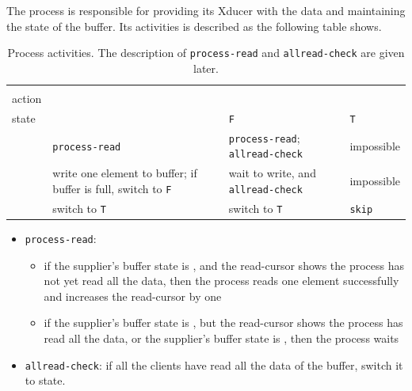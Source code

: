 The process is responsible for providing its Xducer with the data and maintaining the state of the buffer. 
Its activities is described as the following table shows.


 \begin{table}[H]\large
 	\renewcommand\arraystretch{1.5}
 	\centering
 	\begin{tabular}{|l|p{}|p{}|l|}  
 		\hline
 		 \diagbox{Xducer \\ action}{Buffer \\ state} & {\filling} & {\draining} \texttt{F} & {\draining} \texttt{T} \\ \hline
 		{\pin}  & \texttt{process-read}  & \texttt{process-read}; \texttt{allread-check}  & impossible \\
 		\hline
 		{\pout} &  write one element to buffer;
 		if buffer is full, switch to {\draining} \texttt{F}    &    wait to write, and \texttt{allread-check}   & impossible \\ 
 		\hline
 		{\done} &  switch to {\draining} \texttt{T}      & switch to {\draining} \texttt{T}   & \texttt{skip}  \\ 
 		\hline
 	\end{tabular}
 \caption{Process activities. The description of \texttt{process-read} and \texttt{allread-check} are given later.}
 \end{table}

\begin{itemize}
\item \texttt{process-read}:

\begin{itemize}
	\item if the supplier's buffer state is {\draining}, and the read-cursor shows the process has not yet read all the data, then the process reads one element successfully and increases the read-cursor by one
	\item if the supplier's buffer state is {\draining}, but the read-cursor shows the process has read all the data, or the supplier's buffer state is {\filling}, then the process waits 
\end{itemize}

\item \texttt{allread-check}: if all the clients have read all the data of the buffer, switch it to {\filling} state.
\end{itemize}

